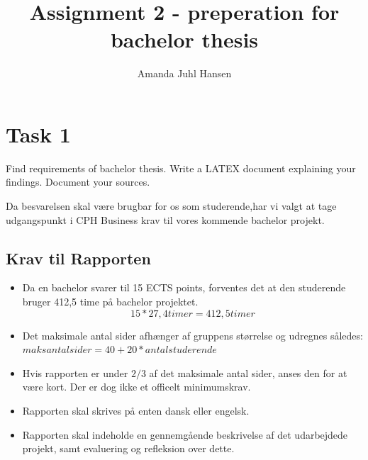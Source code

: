 \documentclass{article}
\author{Amanda Juhl Hansen}
\title{Assignment 2 - preperation for bachelor thesis}
\begin{document}
\clearpage\maketitle
\thispagestyle{empty}
\tableofcontents
\listoffigures
\listoftables

\newpage
    \section{Task 1}
    
    Find requirements of bachelor thesis. Write a LATEX document explaining your
    findings. Document your sources.
    \newline 

    Da besvarelsen skal være brugbar for os som studerende,har vi valgt at tage udgangspunkt i CPH Business krav til vores kommende bachelor projekt. \cite{softwebsite}

    \subsection*{Krav til Rapporten}
    \begin{itemize}
        \item Da en bachelor svarer til 15 ECTS points, forventes det at den studerende bruger 412,5 time på bachelor projektet.  
            \[ 15 * 27,4 timer = 412,5 timer \]
        \item Det maksimale antal sider afhænger af gruppens størrelse og udregnes således: \(maksantalsider = 40 + 20 * antalstuderende\)
        \item Hvis rapporten er under \(2/3\) af det maksimale antal sider, anses den for at være kort. Der er dog ikke et officelt minimumskrav.  
        \item Rapporten skal skrives på enten dansk eller engelsk.
        \item Rapporten skal indeholde en gennemgående beskrivelse af det udarbejdede projekt, samt evaluering og refleksion over dette.
    \end{itemize}
\end{document}
